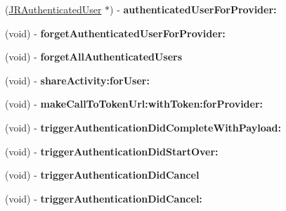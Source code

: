 \begin{DoxyCompactItemize}
\item 
\hypertarget{interface_j_r_session_data_a6d24dbdb7a1d35dae35af2fe4da25db2}{
(\hyperlink{interface_j_r_authenticated_user}{JRAuthenticatedUser} $\ast$) -\/ {\bfseries authenticatedUserForProvider:}}
\label{interface_j_r_session_data_a6d24dbdb7a1d35dae35af2fe4da25db2}

\item 
\hypertarget{interface_j_r_session_data_abd08a39caacbd348a768efa94f896e6e}{
(void) -\/ {\bfseries forgetAuthenticatedUserForProvider:}}
\label{interface_j_r_session_data_abd08a39caacbd348a768efa94f896e6e}

\item 
\hypertarget{interface_j_r_session_data_afe29f85a7012bedd38b2e0fa9d1b8e5f}{
(void) -\/ {\bfseries forgetAllAuthenticatedUsers}}
\label{interface_j_r_session_data_afe29f85a7012bedd38b2e0fa9d1b8e5f}

\item 
\hypertarget{interface_j_r_session_data_af82483cf7b94648229763514cef6dbc4}{
(void) -\/ {\bfseries shareActivity:forUser:}}
\label{interface_j_r_session_data_af82483cf7b94648229763514cef6dbc4}

\item 
\hypertarget{interface_j_r_session_data_a03661ec8f07da5c5b67dba33032679e4}{
(void) -\/ {\bfseries makeCallToTokenUrl:withToken:forProvider:}}
\label{interface_j_r_session_data_a03661ec8f07da5c5b67dba33032679e4}

\item 
\hypertarget{interface_j_r_session_data_a7f44c2c0dfce93c3c983656124acd160}{
(void) -\/ {\bfseries triggerAuthenticationDidCompleteWithPayload:}}
\label{interface_j_r_session_data_a7f44c2c0dfce93c3c983656124acd160}

\item 
\hypertarget{interface_j_r_session_data_a3e98e75782303c52128258d7e750d33c}{
(void) -\/ {\bfseries triggerAuthenticationDidStartOver:}}
\label{interface_j_r_session_data_a3e98e75782303c52128258d7e750d33c}

\item 
\hypertarget{interface_j_r_session_data_a28a5483e68020b3a226571b717bda83d}{
(void) -\/ {\bfseries triggerAuthenticationDidCancel}}
\label{interface_j_r_session_data_a28a5483e68020b3a226571b717bda83d}

\item 
\hypertarget{interface_j_r_session_data_a23fdac5e4d267be7e5a738b54536f062}{
(void) -\/ {\bfseries triggerAuthenticationDidCancel:}}
\label{interface_j_r_session_data_a23fdac5e4d267be7e5a738b54536f062}


\end{DoxyCompactItemize}
